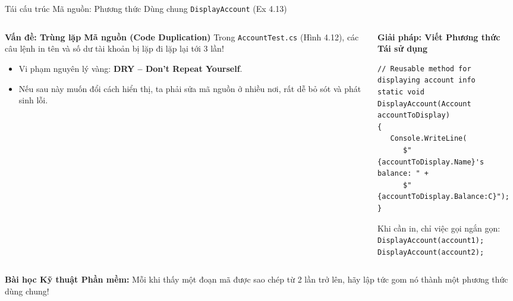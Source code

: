 \documentclass[aspectratio=169, 10pt]{beamer}
\begin{document}
\begin{frame}[fragile]{Tái cấu trúc Mã nguồn: Phương thức Dùng chung \texttt{DisplayAccount} (Ex 4.13)}
  \begin{columns}[T]
    \begin{column}{0.48\textwidth}
      \begin{alertblock}{\textbf{Vấn đề: Trùng lặp Mã nguồn (Code Duplication)}}
        Trong \texttt{AccountTest.cs} (Hình 4.12), các câu lệnh in tên và số dư tài khoản bị lặp đi lặp lại tới 3 lần!
        \begin{itemize}\small
          \item Vi phạm nguyên lý vàng: \textbf{DRY -- Don't Repeat Yourself}.
          \item Nếu sau này muốn đổi cách hiển thị, ta phải sửa mã nguồn ở nhiều nơi, rất dễ bỏ sót và phát sinh lỗi.
        \end{itemize}
      \end{alertblock}
    \end{column}

    \begin{column}{0.48\textwidth}
      \begin{exampleblock}{\textbf{Giải pháp: Viết Phương thức Tái sử dụng}}
\begin{lstlisting}
// Reusable method for displaying account info
static void DisplayAccount(Account accountToDisplay)
{
   Console.WriteLine(
      $"{accountToDisplay.Name}'s balance: " +
      $"{accountToDisplay.Balance:C}");
}
\end{lstlisting}
        \small Khi cần in, chỉ việc gọi ngắn gọn:\\
        \texttt{DisplayAccount(account1);}\\
        \texttt{DisplayAccount(account2);}
      \end{exampleblock}
    \end{column}
  \end{columns}
  \vspace{2mm}
  \begin{block}{\textbf{Bài học Kỹ thuật Phần mềm:}}
    Mỗi khi thấy một đoạn mã được sao chép từ 2 lần trở lên, hãy lập tức gom nó thành một phương thức dùng chung!
  \end{block}
\end{frame}
\end{document}
